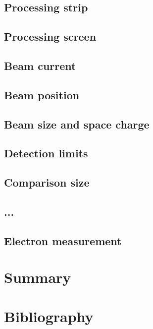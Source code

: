 \begin{refsection}
  \subsection{Processing strip}
  \cite{Brun1997,Antcheva2009}
  \subsection{Processing screen}
  \subsection{Beam current}
  \subsection{Beam position}
  \subsection{Beam size and space charge}
  \subsection{Detection limits}
  \subsection{Comparison size}
  \subsection{...}
  \subsection{Electron measurement}

  \section{Summary}
  \label{ch4:Summary}

  \cleardoublepage
  \section{Bibliography}
  \label{ch4:bib}
  \printbibliography[heading=subbibliography]

\end{refsection}